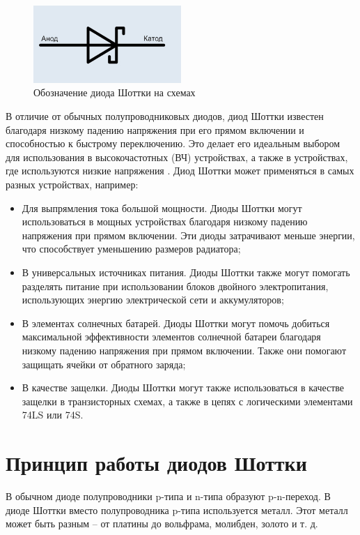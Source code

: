 \documentclass[spec, och, referat]{shiza}
\begin{document}
\begin{figure}[H]
  \centering
  \includegraphics[width=0.5\textwidth]{photo/1.png}
  \caption{Обозначение диода Шоттки на схемах}
\end{figure}

В отличие от обычных полупроводниковых диодов, диод Шоттки известен благодаря низкому падению напряжения при его прямом включении и способностью к быстрому 
переключению. Это делает его идеальным выбором для использования в высокочастотных (ВЧ) устройствах, а также в устройствах, где используются низкие 
напряжения \cite{2}. Диод Шоттки может применяться в самых разных устройствах, например:

\begin{itemize}
  \item Для выпрямления тока большой мощности. Диоды Шоттки могут использоваться в мощных устройствах благодаря низкому падению напряжения при прямом
  включении. Эти диоды затрачивают меньше энергии, что способствует уменьшению размеров радиатора;
  \item В универсальных источниках питания. Диоды Шоттки также могут помогать разделять питание при использовании
  блоков двойного электропитания, использующих энергию электрической сети и аккумуляторов;
  \item В элементах солнечных батарей. Диоды Шоттки могут помочь добиться максимальной эффективности элементов солнечной батареи благодаря
  низкому падению напряжения при прямом включении. Также они помогают защищать ячейки от обратного заряда;
  \item В качестве защелки. Диоды Шоттки могут также использоваться в качестве защелки в транзисторных схемах, а также в цепях с
  логическими элементами 74LS или 74S.
\end{itemize}

\section{Принцип работы диодов Шоттки}

В обычном диоде полупроводники p-типа и n-типа образуют p-n-переход. В диоде Шоттки вместо полупроводника p-типа используется металл. 
Этот металл может быть разным – от платины до вольфрама, молибден, золото и т. д. 
\end{document}
